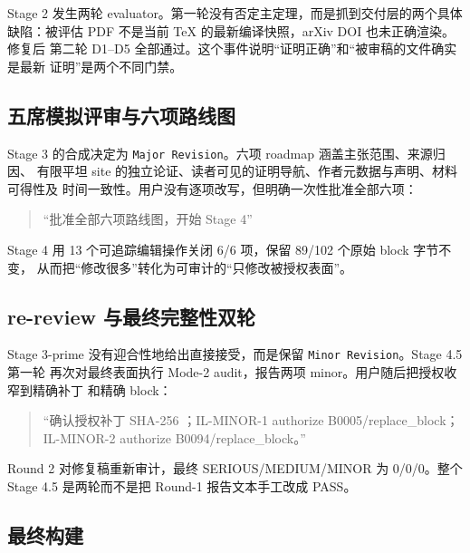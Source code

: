 \documentclass[12pt,a4paper]{article}
\begin{document}
Stage 2 发生两轮
evaluator。第一轮没有否定主定理，而是抓到交付层的两个具体 缺陷：被评估
PDF 不是当前 TeX 的最新编译快照，arXiv DOI 也未正确渲染。修复后 第二轮
D1--D5 全部通过。这个事件说明``证明正确''和``被审稿的文件确实是最新
证明''是两个不同门禁。

\hypertarget{ux4e94ux5e2dux6a21ux62dfux8bc4ux5ba1ux4e0eux516dux9879ux8defux7ebfux56fe}{%
\subsection{五席模拟评审与六项路线图}\label{ux4e94ux5e2dux6a21ux62dfux8bc4ux5ba1ux4e0eux516dux9879ux8defux7ebfux56fe}}

Stage 3 的合成决定为 \texttt{Major\ Revision}。六项 roadmap
涵盖主张范围、来源归因、 有限平坦 site
的独立论证、读者可见的证明导航、作者元数据与声明、材料可得性及
时间一致性。用户没有逐项改写，但明确一次性批准全部六项：

\begin{quote}
``批准全部六项路线图，开始 Stage 4''
\end{quote}

Stage 4 用 13 个可追踪编辑操作关闭 6/6 项，保留 89/102 个原始 block
字节不变， 从而把``修改很多''转化为可审计的``只修改被授权表面''。

\hypertarget{re-review-ux4e0eux6700ux7ec8ux5b8cux6574ux6027ux53ccux8f6e}{%
\subsection{re-review
与最终完整性双轮}\label{re-review-ux4e0eux6700ux7ec8ux5b8cux6574ux6027ux53ccux8f6e}}

Stage 3-prime 没有迎合性地给出直接接受，而是保留
\texttt{Minor\ Revision}。Stage 4.5 第一轮 再次对最终表面执行 Mode-2
audit，报告两项 minor。用户随后把授权收窄到精确补丁 和精确 block：

\begin{quote}
``确认授权补丁 SHA-256
；IL-MINOR-1
authorize B0005/replace\_block；IL-MINOR-2 authorize
B0094/replace\_block。''
\end{quote}

Round 2 对修复稿重新审计，最终 SERIOUS/MEDIUM/MINOR 为 0/0/0。整个 Stage
4.5 是两轮而不是把 Round-1 报告文本手工改成 PASS。

\hypertarget{ux6700ux7ec8ux6784ux5efa}{%
\subsection{最终构建}\label{ux6700ux7ec8ux6784ux5efa}}
\end{document}
